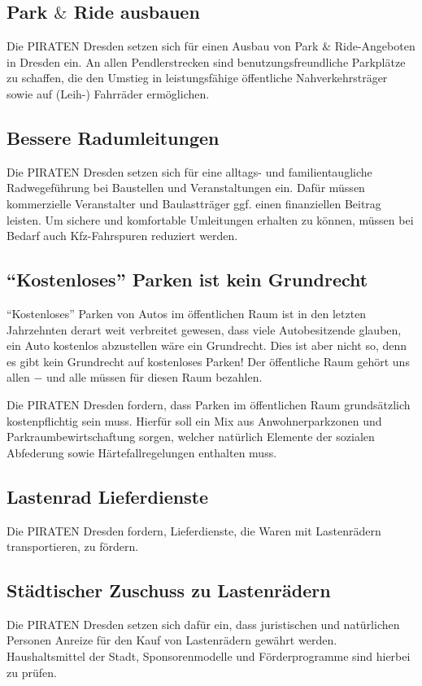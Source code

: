 \documentclass[a4paper, 11pt]{article}
\begin{document}
\subsection{Park $\&$ Ride ausbauen}
Die PIRATEN Dresden setzen sich für einen Ausbau von Park $\&$ Ride-Angeboten in Dresden ein. An allen Pendlerstrecken sind benutzungsfreundliche Parkplätze zu schaffen, die den Umstieg in leistungsfähige öffentliche Nahverkehrsträger sowie auf (Leih-) Fahrräder ermöglichen.


\subsection{Bessere Radumleitungen}
Die PIRATEN Dresden setzen sich für eine alltags- und familientaugliche Radwegeführung bei Baustellen und Veranstaltungen ein. Dafür müssen kommerzielle Veranstalter und Baulastträger ggf. einen finanziellen Beitrag leisten. Um sichere und komfortable Umleitungen erhalten zu können, müssen bei Bedarf auch Kfz-Fahrspuren reduziert werden.


\subsection{``Kostenloses'' Parken ist kein Grundrecht}
``Kostenloses'' Parken von Autos im öffentlichen Raum ist in den letzten Jahrzehnten derart weit verbreitet gewesen, dass viele Autobesitzende glauben, ein Auto kostenlos abzustellen wäre ein Grundrecht. Dies ist aber nicht so, denn es gibt kein Grundrecht auf kostenloses Parken! Der öffentliche Raum gehört uns allen $-$ und alle müssen für diesen Raum bezahlen.

Die PIRATEN Dresden fordern, dass Parken im öffentlichen Raum grundsätzlich kostenpflichtig sein muss. Hierfür soll ein Mix aus Anwohnerparkzonen und Parkraumbewirtschaftung sorgen, welcher natürlich Elemente der sozialen Abfederung sowie Härtefallregelungen enthalten muss.


\subsection{Lastenrad Lieferdienste}
Die PIRATEN Dresden fordern, Lieferdienste, die Waren mit Lastenrädern transportieren, zu fördern.


\subsection{Städtischer Zuschuss zu Lastenrädern}
Die PIRATEN Dresden setzen sich dafür ein, dass juristischen und natürlichen Personen Anreize für den Kauf von Lastenrädern gewährt werden. Haushaltsmittel der Stadt, Sponsorenmodelle und Förderprogramme sind hierbei zu prüfen.
\end{document}
